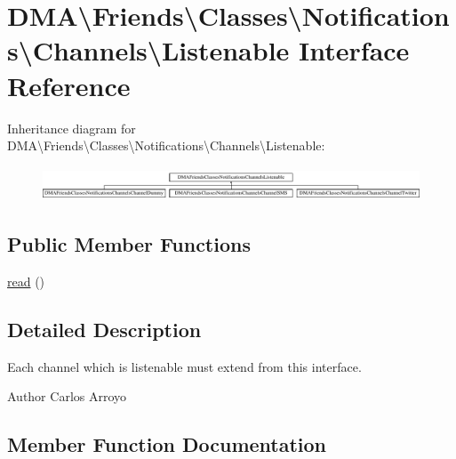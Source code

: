\hypertarget{interfaceDMA_1_1Friends_1_1Classes_1_1Notifications_1_1Channels_1_1Listenable}{}\section{D\+M\+A\textbackslash{}Friends\textbackslash{}Classes\textbackslash{}Notifications\textbackslash{}Channels\textbackslash{}Listenable Interface Reference}
\label{interfaceDMA_1_1Friends_1_1Classes_1_1Notifications_1_1Channels_1_1Listenable}
Inheritance diagram for D\+M\+A\textbackslash{}Friends\textbackslash{}Classes\textbackslash{}Notifications\textbackslash{}Channels\textbackslash{}Listenable\+:\begin{figure}[H]
\begin{center}
\leavevmode
\includegraphics[height=1.020036cm]{d7/d72/interfaceDMA_1_1Friends_1_1Classes_1_1Notifications_1_1Channels_1_1Listenable}
\end{center}
\end{figure}
\subsection*{Public Member Functions}
\begin{DoxyCompactItemize}
\item 
\hyperlink{interfaceDMA_1_1Friends_1_1Classes_1_1Notifications_1_1Channels_1_1Listenable_aebc4dc5c57897e075a719e911a590d6e}{read} ()
\end{DoxyCompactItemize}


\subsection{Detailed Description}
Each channel which is listenable must extend from this interface. \begin{DoxyAuthor}{Author}
Carlos Arroyo 
\end{DoxyAuthor}


\subsection{Member Function Documentation}
\hypertarget{interfaceDMA_1_1Friends_1_1Classes_1_1Notifications_1_1Channels_1_1Listenable_aebc4dc5c57897e075a719e911a590d6e}{}
